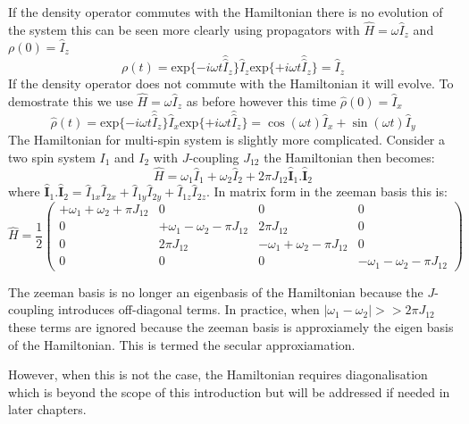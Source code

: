 If the density operator commutes with the Hamiltonian there is no evolution of the system
this can be seen more clearly using propagators with $\hat{H} = \omega\hat{I}_z$ and $\rho(0) = \hat{I}_z$
\begin{equation}
  \rho(t) = \text{exp}\{-i\omega t\hat{\hat{I}}_z\}\hat{I}_z\text{exp}\{+i\omega t\hat{\hat{I}}_z\} = \hat{I}_z
\end{equation}
If the density operator does not commute with the Hamiltonian it will evolve. To demostrate this we use $\hat{H} = \omega\hat{I}_z$ as before  however this time $\hat\rho(0) = \hat{I}_x$
\begin{equation}
  \hat\rho(t) = \text{exp}\{-i\omega t\hat{\hat{I}}_z\}\hat{I}_x\text{exp}\{+i\omega t\hat{\hat{I}}_z\} = \cos(\omega t)\hat{I}_x + \sin(\omega t)\hat{I}_y
\end{equation}
The Hamiltonian for multi-spin system is slightly more complicated. Consider a two spin
system $I_1$ and $I_2$ with $J$-coupling $J_{12}$ the Hamiltonian then becomes:
\begin{equation}
  \hat{H} = \omega_1\hat{I}_1 + \omega_2\hat{I}_2 + 2\pi J_{12}\hat{\mathbf{I}}_1.\hat{\mathbf{I}}_2
\end{equation}
where $\hat{\mathbf{I}}_1.\hat{\mathbf{I}}_2 = \hat{I}_{1x}\hat{I}_{2x} + \hat{I}_{1y}\hat{I}_{2y} + \hat{I}_{1z}\hat{I}_{2z}$.
In matrix form in the zeeman basis this is:
\begin{equation}
  \hat{H} = \frac{1}{2}\begin{pmatrix}
    +\omega_1 + \omega_2 + \pi J_{12} & 0 & 0 & 0\\
    0 & +\omega_1 - \omega_2 - \pi J_{12} & 2\pi J_{12} & 0\\
    0 & 2\pi J_{12} & -\omega_1 + \omega_2 - \pi J_{12} & 0\\
    0 & 0 & 0 & -\omega_1 - \omega_2 - \pi J_{12}
\end{pmatrix}
\end{equation}

The zeeman basis is no longer an eigenbasis of the Hamiltonian because the $J$-coupling
introduces off-diagonal terms. In practice, when $|\omega_1-\omega_2| >> 2\pi J_{12}$
these terms are ignored because the zeeman basis is approxiamely the eigen basis of the Hamiltonian. This is termed the secular approxiamation.

However, when this is not the case, the Hamiltonian requires diagonalisation which is beyond the scope of this introduction but will be addressed if needed in later chapters.

